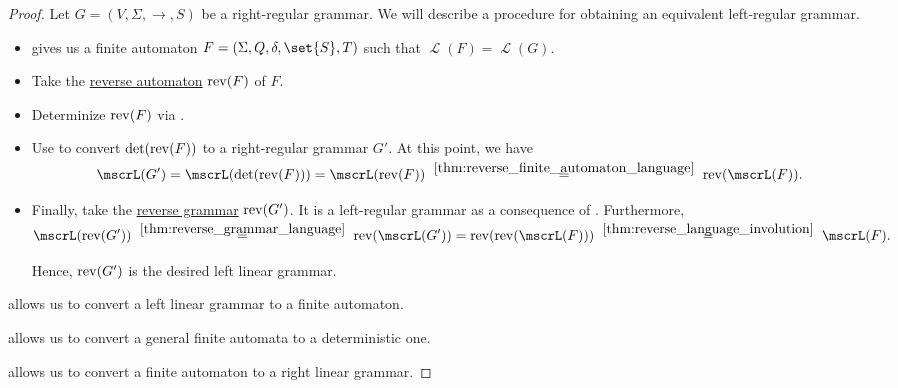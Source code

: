 \begin{proof}
   Let \( G = (V, \Sigma, \to, S) \) be a right-regular grammar. We will describe a procedure for obtaining an equivalent left-regular grammar.

  \begin{itemize}
    \item {} gives us a finite automaton \( F = (\Sigma, Q, \delta, \set{ S }, T) \) such that \( \mscrL(F) = \mscrL(G) \).

    \item Take the \hyperref[def:reverse_finite_automaton]{reverse automaton} \( \op{rev}(F) \) of \( F \).

    \item Determinize \( \op{rev}(F) \) via .

    \item Use  to convert \( \det(\op{rev}(F)) \) to a right-regular grammar \( G' \). At this point, we have
    \begin{equation*}
      \mscrL(G')
      =
      \mscrL(\det(\op{rev}(F)))
      =
      \mscrL(\op{rev}(F))
      \reloset {\ref{thm:reverse_finite_automaton_language}} =
      \op{rev}(\mscrL(F)).
    \end{equation*}

    \item Finally, take the \hyperref[def:reverse_grammar]{reverse grammar} \( \op{rev}(G') \). It is a left-regular grammar as a consequence of . Furthermore,
    \begin{equation*}
      \mscrL(\op{rev}(G'))
      \reloset {\ref{thm:reverse_grammar_language}} =
      \op{rev}(\mscrL(G'))
      =
      \op{rev}(\op{rev}(\mscrL(F)))
      \reloset {\ref{thm:reverse_language_involution}} =
      \mscrL(F).
    \end{equation*}

    Hence, \( \op{rev}(G') \) is the desired left linear grammar.
  \end{itemize}

    allows us to convert a left linear grammar to a finite automaton.

    allows us to convert a general finite automata to a deterministic one.

    allows us to convert a finite automaton to a right linear grammar.
\end{proof}

